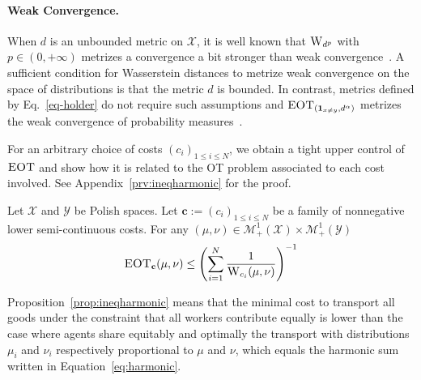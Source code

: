 \paragraph{Weak Convergence.} When $d$ is an unbounded metric on $\mathcal{X}$, it is well known that $\textsc{W}_{d^{p}}$ with $p\in(0,+\infty)$ metrizes a convergence a bit stronger than weak convergence~\citep[Chap. 7]{villani2003topics}.  A sufficient condition for Wasserstein distances to metrize weak convergence on the space of distributions is that the metric $d$ is bounded. In contrast, metrics defined by Eq.~\eqref{eq-holder} do not require such assumptions and $\textsc{EOT}_{(\mathbf{1}_{x\neq y},d^{\alpha})}$  metrizes the weak convergence of probability measures~\citep[Chap. 1-7]{villani2003topics}. 

For an arbitrary choice of costs $(c_i)_{1\leq i\leq N}$, we obtain a tight upper control of $\textsc{EOT}$ and show how it is related to the OT problem associated to each cost involved. See Appendix~\ref{prv:ineqharmonic} for the proof. 
\begin{prop}

\label{prop:ineqharmonic}
Let  $\mathcal{X}$ and $\mathcal{Y}$ be Polish spaces. Let $\mathbf{c}:=(c_i)_{1\leq i\leq N}$ be a family of nonnegative lower semi-continuous costs. For any $(\mu,\nu)\in\mathcal{M}_+^{1}(\mathcal{X})\times\mathcal{M}_+^{1}(\mathcal{Y})$
\begin{align}
\label{eq:harmonic}
    \MOT_{\mathbf{c}}(\mu,\nu)\leq \left(\sum\limits_{i=1}^N\frac{1}{\wass_{c_i}(\mu,\nu)}\right)^{-1} %
\end{align}
\end{prop}
Proposition~\ref{prop:ineqharmonic} means that %
the minimal cost to transport all goods under the constraint that all workers contribute equally is lower than the case where agents share equitably and optimally the transport with distributions $\mu_i$ and $\nu_i$ respectively proportional to $\mu$ and $\nu$, which equals the harmonic sum written in Equation~\eqref{eq:harmonic}.

